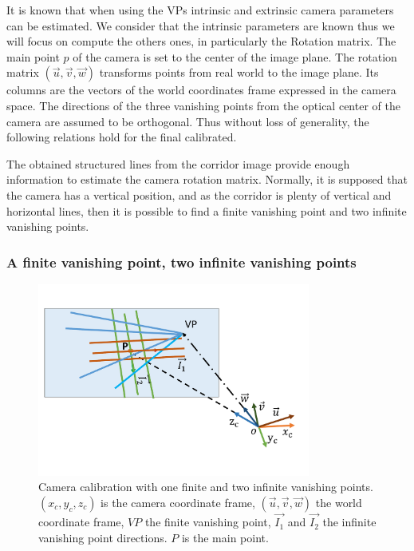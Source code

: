 It is known that when using the VPs intrinsic and extrinsic camera parameters can be estimated. We consider that the intrinsic parameters are known thus we will focus on compute the others ones, in particularly the Rotation matrix.
The main point $p$ of the camera is set to the center of the image plane. The rotation matrix
$(\vec{u},\vec{v},\vec{w})$ transforms points from real world to the image plane. Its columns are the vectors of the world coordinates frame expressed in the camera space. The directions of the three vanishing points from the optical center of the camera are assumed to be orthogonal. Thus without loss of generality, the following relations hold for the final calibrated.


The obtained structured lines  from the corridor image provide enough information to estimate the camera rotation matrix.
Normally, it is supposed that the camera has a vertical position, and  as the corridor is plenty of vertical and horizontal lines, then it is possible to find a finite vanishing point and two infinite vanishing points.


\subsubsection*{A finite vanishing point, two infinite vanishing points}

\begin{figure}[h!]
\centering
\includegraphics[width=0.8\textwidth]{Chapter03/Images/twoInfiniteVPOneFVPG.pdf}
\caption{Camera calibration with one finite and two infinite vanishing points. $(x_c,y_c,z_c)$ is the camera coordinate frame, $(\vec{u},\vec{v},\vec{w})$ the world coordinate frame, $VP$ the finite vanishing point, $\vec{I_1}$ and $\vec{I_2}$ the infinite vanishing point directions. $P$ is the main point.}
\label{fig:3_unpunto}
\end{figure}

